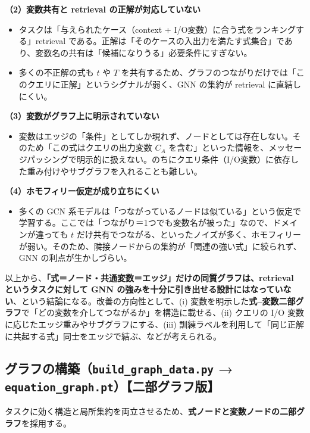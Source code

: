 \documentclass[11pt,a4paper]{jsarticle}
\begin{document}
\textbf{（2）変数共有と retrieval の正解が対応していない}
\begin{itemize}[nosep]
  \item タスクは「与えられたケース（context + I/O変数）に合う式をランキングする」retrieval である。正解は「そのケースの入出力を満たす式集合」であり、変数名の共有は「候補になりうる」必要条件にすぎない。
  \item 多くの不正解の式も $t$ や $T$ を共有するため、グラフのつながりだけでは「このクエリに正解」というシグナルが弱く、GNN の集約が retrieval に直結しにくい。
\end{itemize}

\textbf{（3）変数がグラフ上に明示されていない}
\begin{itemize}[nosep]
  \item 変数はエッジの「条件」としてしか現れず、ノードとしては存在しない。そのため「この式はクエリの出力変数 $C_A$ を含む」といった情報を、メッセージパッシングで明示的に扱えない。のちにクエリ条件（I/O変数）に依存した重み付けやサブグラフを入れることも難しい。
\end{itemize}

\textbf{（4）ホモフィリー仮定が成り立ちにくい}
\begin{itemize}[nosep]
  \item 多くの GCN 系モデルは「つながっているノードは似ている」という仮定で学習する。ここでは「つながり＝1つでも変数名が被った」なので、ドメインが違っても $t$ だけ共有でつながる、といったノイズが多く、ホモフィリーが弱い。そのため、隣接ノードからの集約が「関連の強い式」に絞られず、GNN の利点が生かしづらい。
\end{itemize}

以上から、\textbf{「式＝ノード・共通変数＝エッジ」だけの同質グラフは、retrieval というタスクに対して GNN の強みを十分に引き出せる設計にはなっていない}、という結論になる。改善の方向性として、(i) 変数を明示した\textbf{式--変数二部グラフ}で「どの変数を介してつながるか」を構造に載せる、(ii) クエリの I/O 変数に応じたエッジ重みやサブグラフにする、(iii) 訓練ラベルを利用して「同じ正解に共起する式」同士をエッジで結ぶ、などが考えられる。

\subsection{グラフの構築（\texttt{build\_graph\_data.py} → \texttt{equation\_graph.pt}）【二部グラフ版】}
タスクに効く構造と局所集約を両立させるため、\textbf{式ノードと変数ノードの二部グラフ}を採用する。
\end{document}
